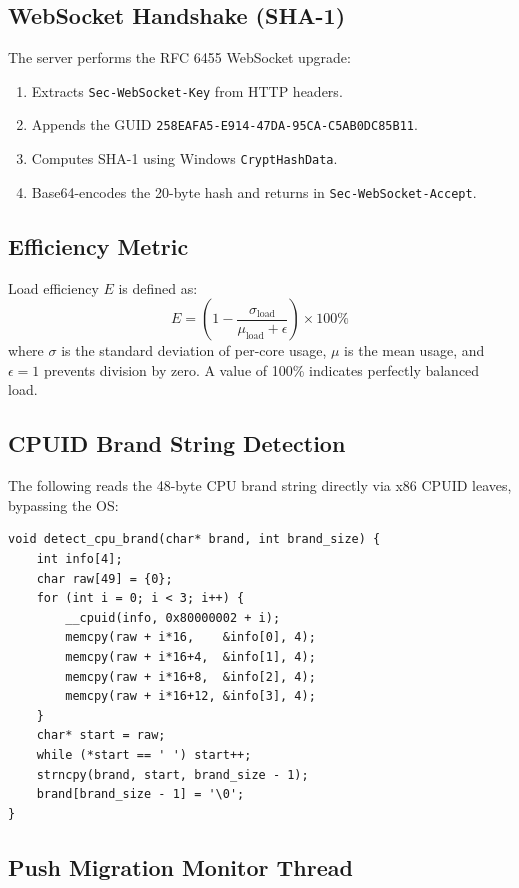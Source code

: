 \documentclass[12pt,a4paper]{article}
\begin{document}
\subsection{WebSocket Handshake (SHA-1)}

The server performs the RFC 6455 WebSocket upgrade:
\begin{enumerate}
  \item Extracts \texttt{Sec-WebSocket-Key} from HTTP headers.
  \item Appends the GUID \texttt{258EAFA5-E914-47DA-95CA-C5AB0DC85B11}.
  \item Computes SHA-1 using Windows \texttt{CryptHashData}.
  \item Base64-encodes the 20-byte hash and returns in \texttt{Sec-WebSocket-Accept}.
\end{enumerate}

\subsection{Efficiency Metric}

Load efficiency $E$ is defined as:
\[
E = \left(1 - \frac{\sigma_{\text{load}}}{\mu_{\text{load}} + \epsilon}\right) \times 100\%
\]
where $\sigma$ is the standard deviation of per-core usage, $\mu$ is the mean usage, and $\epsilon = 1$ prevents division by zero. A value of 100\% indicates perfectly balanced load.

\subsection{CPUID Brand String Detection}

The following reads the 48-byte CPU brand string directly via x86 CPUID leaves, bypassing the OS:

\begin{lstlisting}[style=cstyle, caption={CPUID Brand String Extraction}]
void detect_cpu_brand(char* brand, int brand_size) {
    int info[4];
    char raw[49] = {0};
    for (int i = 0; i < 3; i++) {
        __cpuid(info, 0x80000002 + i);
        memcpy(raw + i*16,    &info[0], 4);
        memcpy(raw + i*16+4,  &info[1], 4);
        memcpy(raw + i*16+8,  &info[2], 4);
        memcpy(raw + i*16+12, &info[3], 4);
    }
    char* start = raw;
    while (*start == ' ') start++;
    strncpy(brand, start, brand_size - 1);
    brand[brand_size - 1] = '\0';
}
\end{lstlisting}

\subsection{Push Migration Monitor Thread}
\end{document}
